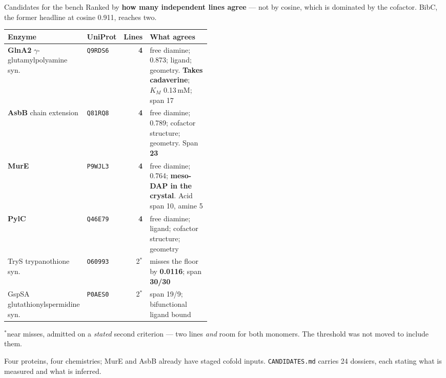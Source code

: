 \documentclass[aspectratio=169,10pt]{beamer}
\newcommand{\good}[1]{{\color{cGood}\textbf{#1}}}
\newcommand{\bad}[1]{{\color{cBad}#1}}
\newcommand{\takeaway}[1]{\vfill\begin{tcolorbox}[colback=structure!12!white,
  colframe=structure!60!black,boxrule=0.4pt,left=5pt,right=5pt,top=3pt,bottom=3pt]
  \small #1\end{tcolorbox}}
\begin{document}
\begin{frame}{Candidates for the bench}
  Ranked by \textbf{how many independent lines agree} --- not by cosine, which
  is dominated by the cofactor. \bad{BibC}, the former headline at cosine
  0.911, reaches \bad{two}.

  \smallskip
  \centering\scriptsize
  \begin{tabular}{@{}llr p{0.46\linewidth}@{}}
    \toprule
    \textbf{Enzyme} & \textbf{UniProt} & \textbf{Lines} & \textbf{What agrees} \\
    \midrule
    \good{GlnA2} $\gamma$-glutamylpolyamine syn. & \texttt{Q9RDS6} & \good{4} &
      free diamine; 0.873; ligand; geometry. \textbf{Takes cadaverine};
      $K_M$ 0.13\,mM; span 17 \\
    \good{AsbB} chain extension & \texttt{Q81RQ8} & \good{4} &
      free diamine; 0.789; cofactor structure; geometry. Span \textbf{23} \\
    \good{MurE} & \texttt{P9WJL3} & \good{4} &
      free diamine; 0.764; \textbf{meso-DAP in the crystal}. Acid span 10,
      amine 5 \\
    \good{PylC} & \texttt{Q46E79} & \good{4} &
      free diamine; ligand; cofactor structure; geometry \\
    \midrule
    TryS trypanothione syn. & \texttt{O60993} & 2$^\ast$ &
      misses the floor by \textbf{0.0116}; span \textbf{30/30} \\
    GspSA glutathionylspermidine syn. & \texttt{P0AES0} & 2$^\ast$ &
      span 19/9; bifunctional ligand bound \\
    \bottomrule
  \end{tabular}

  \smallskip
  {\scriptsize $^\ast$near misses, admitted on a \emph{stated} second
  criterion --- two lines \emph{and} room for both monomers. The threshold was
  not moved to include them.}

  \takeaway{Four proteins, four chemistries; MurE and AsbB already have staged
  cofold inputs. \texttt{CANDIDATES.md} carries 24 dossiers, each stating what
  is measured and what is inferred.}
\end{frame}
\end{document}
